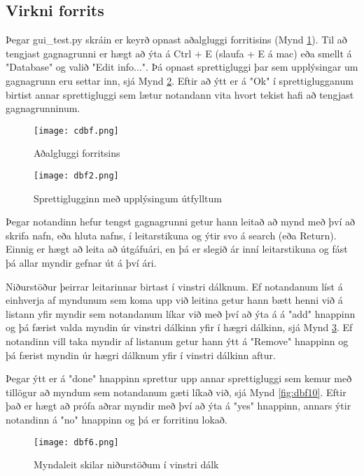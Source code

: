\documentclass[12pt, git, draft]{rureport}
\begin{document}
\subsection{Virkni forrits}
Þegar gui\_test.py skráin er keyrð opnast aðalgluggi forritisins (Mynd \ref{fig:cdbf}). Til að tengjast gagnagrunni er hægt að ýta á Ctrl + E (slaufa + E á mac) eða smellt á "Database" og valið "Edit info...". Þá opnast sprettigluggi þar sem upplýsingar um gagnagrunn eru settar inn, sjá Mynd \ref{fig:dbf2}. Eftir að ýtt er á "Ok" í sprettiglugganum birtist annar sprettigluggi sem lætur notandann vita hvort tekist hafi að tengjast gagnagrunninum.

\begin{figure}[h!]
	\centering 
	\texttt{[image: cdbf.png]}
	\caption{Aðalgluggi forritsins \label{fig:cdbf}}
\end{figure}

\begin{figure}[h!]
	\centering 
	\texttt{[image: dbf2.png]}
	\caption{Sprettiglugginn með upplýsingum útfylltum \label{fig:dbf2}}
\end{figure}

Þegar notandinn hefur tengst gagnagrunni getur hann leitað að mynd með því að skrifa nafn, eða hluta nafns, í leitarstikuna og ýtir svo á search (eða Return). Einnig er hægt að leita að útgáfuári, en þá er slegið ár inní leitarstikuna og fást þá allar myndir gefnar út á því ári.

Niðurstöður þeirrar leitarinnar birtast í vinstri dálknum. Ef notandanum líst á einhverja af myndunum sem koma upp við leitina getur hann bætt henni við á listann yfir myndir sem notandanum líkar við með því að ýta á á "add" hnappinn og þá færist valda myndin úr vinstri dálkinn yfir í hægri dálkinn, sjá Mynd \ref{fig:dbf6}. Ef notandinn vill taka myndir af listanum getur hann ýtt á "Remove" hnappinn og þá færist myndin úr hægri dálknum yfir í vinstri dálkinn aftur.

Þegar ýtt er á "done" hnappinn sprettur upp annar sprettigluggi sem kemur með tillögur að myndum sem notandanum gæti líkað við, sjá Mynd \ref{fig:dbf10}. Eftir það er hægt að prófa aðrar myndir með því að ýta á "yes" hnappinn, annars ýtir notandinn á "no" hnappinn og þá er forritinu lokað.

\begin{figure}
	\centering 
	\texttt{[image: dbf6.png]}
	\caption{Myndaleit skilar niðurstöðum í vinstri dálk\label{fig:dbf6}}
\end{figure}
\end{document}
